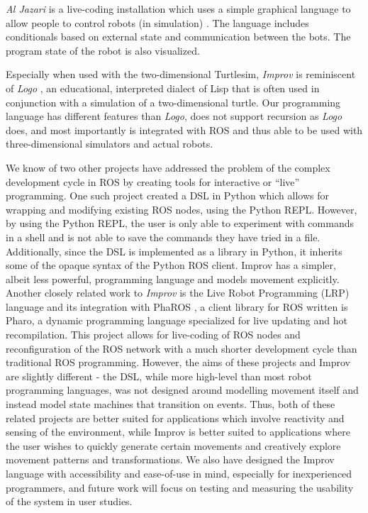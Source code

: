\documentclass[sigconf]{acmart}
\begin{document}
\emph{Al Jazari} is a live-coding installation which uses a simple
graphical language to allow people to control robots (in simulation)
\cite{mclean2010visualisation}. The language includes conditionals based on external state and
communication between the bots. The program state of the robot is also
visualized.

Especially when used with the two-dimensional Turtlesim, \emph{Improv}
is reminiscent of \emph{Logo} \cite{logo}, an educational, interpreted
dialect of Lisp that is often used in conjunction with a simulation of a
two-dimensional turtle. Our programming language has different features
than \emph{Logo}, does not support recursion as \emph{Logo} does, and
most importantly is integrated with ROS and thus able to be used with
three-dimensional simulators and actual robots.

We know of two other projects have addressed the problem of the complex
development cycle in ROS by creating tools for interactive or ``live''
programming. One such project \cite{python_live_DSLRob} created a DSL in Python
which allows for wrapping and modifying existing ROS nodes, using the Python
REPL. However, by using the Python REPL, the user is only able to experiment
with commands in a shell and is not able to save the commands they have tried in
a file. Additionally, since the DSL is implemented as a library in Python, it
inherits some of the opaque syntax of the Python ROS client. Improv has a
simpler, albeit less powerful, programming language and models movement
explicitly. Another closely related work to \emph{Improv} is the Live Robot
Programming (LRP) language \cite{campusano2017live} and its integration with PhaROS
\cite{estefo2014towards}, a client library for ROS written is Pharo, a dynamic
programming language specialized for live updating and hot recompilation. This
project allows for live-coding of ROS nodes and reconfiguration of the ROS
network with a much shorter development cycle than traditional ROS programming.
However, the aims of these projects and Improv are slightly different - the DSL,
while more high-level than most robot programming languages, was not designed
around modelling movement itself and instead model state machines that
transition on events. Thus, both of these related projects are better suited for
applications which involve reactivity and sensing of the environment, while
Improv is better suited to applications where the user wishes to quickly
generate certain movements and creatively explore movement patterns and
transformations. We also have designed the Improv language with accessibility
and ease-of-use in mind, especially for inexperienced programmers, and future
work will focus on testing and measuring the usability of the system in user
studies.
\end{document}
